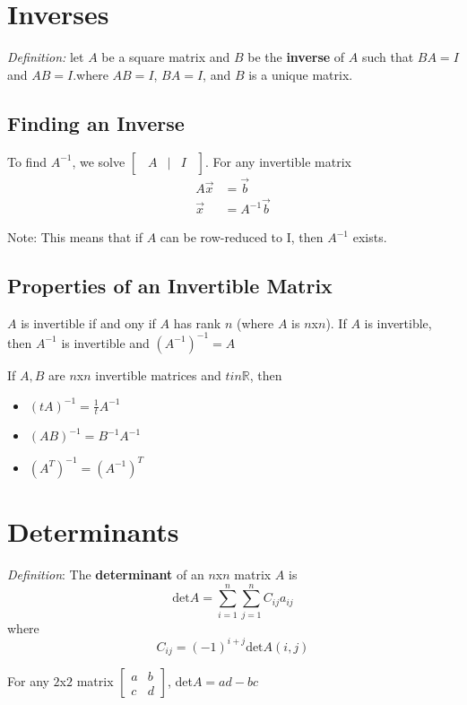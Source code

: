 \documentclass[12pt]{article}
\begin{document}
\section*{Inverses}
\textit{Definition:} let $A$ be a square matrix and $B$ be the {\bf inverse} of $A$ such that $BA = I$ and $AB = I$.where $AB = I$, $BA = I$, and $B$ is a unique matrix.

\subsection*{Finding an Inverse}
To find $A^{-1}$, we solve $\begin{bmatrix}\ \ A&\bigg|&I\ \ \end{bmatrix}$. For any invertible matrix
\begin{align*}
A\vec{x} &= \vec{b}\\
\vec{x} &= A^{-1}\vec{b}
\end{align*}

Note: This means that if $A$ can be row-reduced to I, then $A^{-1}$ exists.

\subsection*{Properties of an Invertible Matrix}
$A$ is invertible if and ony if $A$ has rank $n$ (where $A$ is $n$x$n$). If $A$ is invertible, then $A^{-1}$ is invertible and $(A^{-1})^{-1} = A$

If $A, B$ are $n$x$n$ invertible matrices and $tin\mathbb{R}$, then
\begin{itemize}
\item $(tA)^{-1} = \frac{1}{t}A^{-1}$
\item $(AB)^{-1} = B^{-1}A^{-1}$
\item $(A^T)^{-1} = (A^{-1})^T$
\end{itemize}

\section*{Determinants}
\textit{Definition}: The {\bf determinant} of an $n$x$n$ matrix $A$ is \[ \text{det}A = \sum_{i=1}^n \sum_{j=1}^n C_{ij}a_{ij} \] where \[ C_{ij} = (-1)^{i+j}\text{det}A(i,j) \]

For any $2$x$2$ matrix $\begin{bmatrix}a&b\\c&d\end{bmatrix}$, det$A = ad-bc$
\end{document}
